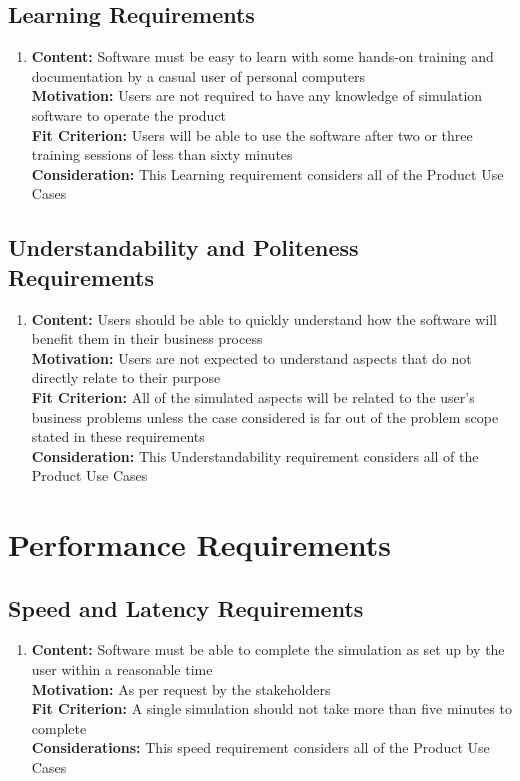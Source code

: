 \documentclass[paper=letter, fontsize=10pt]{scrartcl}
\numberwithin{equation}{section}		%
\numberwithin{figure}{section}			%
\numberwithin{table}{section}				%
\begin{document}
\subsection{Learning Requirements}
\begin{enumerate}
	\item \textbf{Content:} Software must be easy to learn with some hands-on training and documentation by a casual user of personal computers
	\\	  \textbf{Motivation:} Users are not required to have any knowledge of simulation software to operate the product
	\\	  \textbf{Fit Criterion:} Users will be able to use the software after two or three training sessions of less than sixty minutes
	\\	  \textbf{Consideration:} This Learning requirement considers all of the Product Use Cases
\end{enumerate}
\subsection{Understandability and Politeness Requirements}
\begin{enumerate}
	\item \textbf{Content:} Users should be able to quickly understand how the software will benefit them in their business process
	\\	  \textbf{Motivation:} Users are not expected to understand aspects that do not directly relate to their purpose
	\\	  \textbf{Fit Criterion:} All of the simulated aspects will be related to the user's business problems unless the case considered is far out of the problem scope stated in these requirements
	\\	  \textbf{Consideration:} This Understandability requirement considers all of the Product Use Cases	
\end{enumerate}

\section{Performance Requirements}
\subsection{Speed and Latency Requirements}
\begin{enumerate}
	\item \textbf{Content:} Software must be able to complete the simulation as set up by the user within a reasonable time
	\\	  \textbf{Motivation:} As per request by the stakeholders
	\\	  \textbf{Fit Criterion:} A single simulation should not take more than five minutes to complete
	\\	  \textbf{Considerations:} This speed requirement considers all of the Product Use Cases
\end{enumerate}
\end{document}
